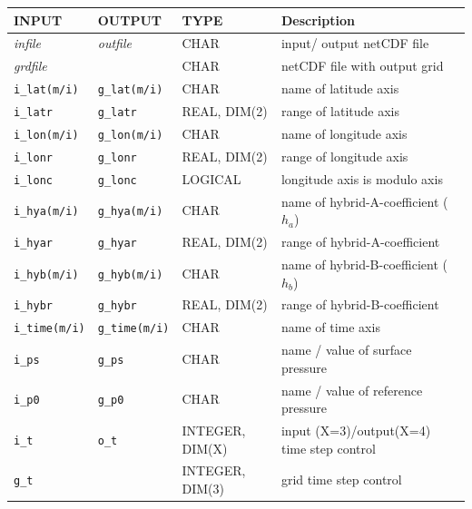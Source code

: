 \documentclass[11pt,twoside]{report}
\begin{document}
\begin{table}

\begin{tabular}{lllp{7.5cm}}
INPUT & OUTPUT & TYPE & Description \\ \hline\hline
{\it infile}       & {\it outfile}       &  CHAR & input/ output netCDF file\\
{\it grdfile}      & \verb||             & CHAR &  netCDF file with output grid\\\hline
\verb|i_lat(m/i)| & \verb|g_lat(m/i)| & CHAR & name of latitude axis\\
\verb|i_latr|      & \verb|g_latr|     & REAL, DIM(2) & range of latitude axis\\
\verb|i_lon(m/i)|  & \verb|g_lon(m/i)| &CHAR             & name of longitude axis\\
\verb|i_lonr|      & \verb|g_lonr|     & REAL, DIM(2) &range of longitude axis\\
\verb|i_lonc|      & \verb|g_lonc|     & LOGICAL            &longitude axis is modulo axis\\
\verb|i_hya(m/i)|  & \verb|g_hya(m/i)| & CHAR         & name of hybrid-A-coefficient ($h_a$)\\
\verb|i_hyar|      & \verb|g_hyar|     & REAL, DIM(2) &range of hybrid-A-coefficient \\
\verb|i_hyb(m/i)|  & \verb|g_hyb(m/i)| & CHAR           &name of hybrid-B-coefficient ($h_b$)\\
\verb|i_hybr|      & \verb|g_hybr|     & REAL, DIM(2) &range of hybrid-B-coefficient \\
\verb|i_time(m/i)| & \verb|g_time(m/i)| & CHAR         & name of time axis\\
\verb|i_ps|         & \verb|g_ps|     & CHAR          & name / value of surface pressure\\
\verb|i_p0|         & \verb|g_p0|     &  CHAR        & name / value of reference pressure\\
\verb|i_t|          & \verb|o_t|       & INTEGER, DIM(X) & input (X=3)/output(X=4) time step control\\
\verb|g_t|          & \verb||          &  INTEGER, DIM(3) & grid time step control\\ \hline


\end{tabular}
\end{table}
\end{document}

